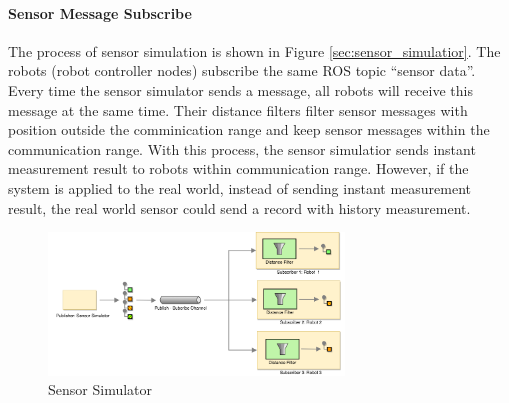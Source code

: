 \paragraph{Sensor Message Subscribe}
The process of sensor simulation is shown in Figure \ref{sec:sensor_simulatior}. The robots (robot controller nodes) subscribe the same ROS topic ``sensor data''. Every time the sensor simulator sends a message, all robots will receive this message at the same time. Their distance filters filter sensor messages with position outside the comminication range and keep sensor messages within the communication range. With this process, the sensor simulatior sends instant measurement result to robots within communication range. However, if the system is applied to the real world, instead of sending instant measurement result, the real world sensor could send a record with history measurement.

\begin{figure}
\centering
\includegraphics[width = 0.7\textwidth]{content/images/ch4/sensor_simulator.drawio.png}
\caption{Sensor Simulator}
\label{fig:sensor_simulator}
\end{figure}